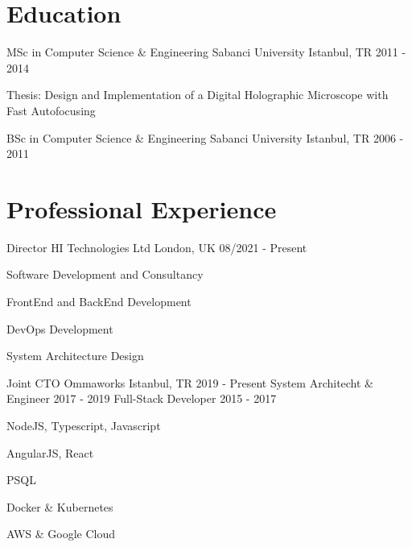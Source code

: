 \documentclass[rightPos]{ReCeiVe}      %
\begin{document}
\makecvheader[L]
\makecvsidebar

\vspace{-\acvSectionTopSkip}
\section{Education}
\cventry
{MSc in Computer Science \& Engineering} %
{Sabanci University} %
{Istanbul, TR} %
{2011 - 2014} %
\begin{cvitems}
\item {Thesis: Design and Implementation of a Digital Holographic Microscope \newline with Fast Autofocusing}
\end{cvitems}

\cventry
{BSc in Computer Science \& Engineering} %
{Sabanci University} %
{Istanbul, TR} %
{2006 - 2011} %

\section{Professional Experience}
\cventry
{Director} %
{HI Technologies Ltd} %
{London, UK} %
{08/2021 - Present} %
\begin{cvitems}
\item {Software Development and Consultancy}
\item {FrontEnd and BackEnd Development}
\item {DevOps Development}
\item {System Architecture Design}
\end{cvitems}

\cventry
{Joint CTO} %
{Ommaworks} %
{Istanbul, TR} %
{2019 - Present} %
\vspace{-3.0mm}
\cventry
{System Architecht \& Engineer} %
{} %
{} %
{2017 - 2019} %
\vspace{-3.0mm}
\cventry
{Full-Stack Developer} %
{} %
{} %
{2015 - 2017} %
\begin{cvitems}
    \item {NodeJS, Typescript, Javascript}
    \item {AngularJS, React}
    \item {PSQL}
    \item {Docker \& Kubernetes}
    \item {AWS \& Google Cloud}
\end{cvitems}
\end{document}
